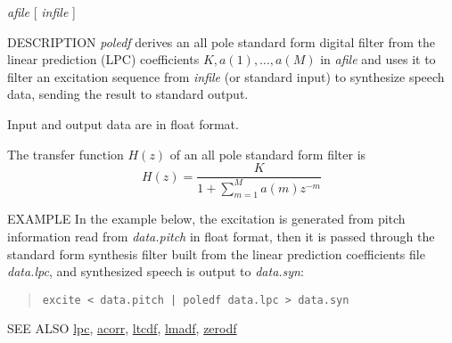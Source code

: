 \begin{synopsis}
\item[poledf] [ --m $M$ ] [ --p $P$ ] [ --i $I$ ] [ --t ] [ --k ]
              {\em afile} [ {\em infile} ]
\end{synopsis}

\begin{qsection}{DESCRIPTION}
{\em poledf} derives an all pole standard form digital filter 
from the linear prediction (LPC) coefficients 
$K,a(1),\dots,a(M)$ in {\em afile} 
and uses it to filter an excitation sequence 
from {\em infile} (or standard input) to synthesize speech data, 
sending the result to standard output.

Input and output data are in float format.

The transfer function $H(z)$ of an all pole standard form
filter is
\begin{displaymath}
H(z) = \frac{K}{\displaystyle 1+\sum_{m=1}^M a(m) z^{-m}}
\end{displaymath}
\end{qsection}

\begin{options}
\end{options}

\begin{qsection}{EXAMPLE}
In the example below, the excitation is generated
from pitch information read from {\em data.pitch} in
float format, then it is passed through the standard form synthesis
filter built from the linear prediction coefficients file
{\em data.lpc}, and synthesized speech is output to
{\em data.syn}:
\begin{quote}
  \verb!excite < data.pitch | poledf data.lpc > data.syn!
\end{quote}
\end{qsection}

\begin{qsection}{SEE ALSO}
\hyperlink{lpc}{lpc},
\hyperlink{acorr}{acorr},
\hyperlink{ltcdf}{ltcdf},
\hyperlink{lmadf}{lmadf},
\hyperlink{zerodf}{zerodf}
\end{qsection}
